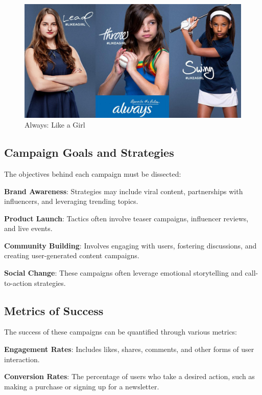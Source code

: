 \documentclass[
]{book}
\begin{document}
\begin{figure}
\centering
\includegraphics{images/always.jpg}
\caption{Always: Like a Girl}
\end{figure}

\hypertarget{campaign-goals-and-strategies}{%
\subsection{Campaign Goals and Strategies}\label{campaign-goals-and-strategies}}

The objectives behind each campaign must be dissected:

\textbf{Brand Awareness}: Strategies may include viral content, partnerships with influencers, and leveraging trending topics.

\textbf{Product Launch}: Tactics often involve teaser campaigns, influencer reviews, and live events.

\textbf{Community Building}: Involves engaging with users, fostering discussions, and creating user-generated content campaigns.

\textbf{Social Change}: These campaigns often leverage emotional storytelling and call-to-action strategies.

\hypertarget{metrics-of-success}{%
\subsection{Metrics of Success}\label{metrics-of-success}}

The success of these campaigns can be quantified through various metrics:

\textbf{Engagement Rates}: Includes likes, shares, comments, and other forms of user interaction.

\textbf{Conversion Rates}: The percentage of users who take a desired action, such as making a purchase or signing up for a newsletter.
\end{document}
